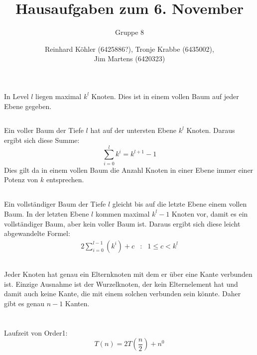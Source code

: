 \documentclass[10pt,a4paper,oneside,ngerman,numbers=noenddot]{scrartcl}
\begin{document}
\author{Reinhard Köhler (6425886?), Tronje Krabbe (6435002), \\
Jim Martens (6420323)}
\title{Hausaufgaben zum 6. November}
\subtitle{Gruppe 8}
\maketitle
\section{} %
	\subsection{} %
		In Level $l$ liegen maximal $k^{l}$ Knoten. Dies ist in einem vollen Baum auf jeder Ebene gegeben.
	\subsection{} %
		Ein voller Baum der Tiefe $l$ hat auf der untersten Ebene $k^{l}$ Knoten. Daraus ergibt sich diese Summe:
		\[
			\sum\limits_{i=0}^{l} k^{i} = k^{l+1} - 1
		\]
		Dies gilt da in einem vollen Baum die Anzahl Knoten in einer Ebene immer einer Potenz von $k$ entsprechen.
	\subsection{} %
		Ein vollständiger Baum der Tiefe $l$ gleicht bis auf die letzte Ebene einem vollen Baum. In der letzten Ebene $l$ kommen maximal $k^{l} - 1$ Knoten vor, damit es ein vollständiger Baum, aber kein voller Baum ist. Daraus ergibt sich diese leicht abgewandelte Formel:
		\begin{alignat*}{2}
			\sum\limits_{i=0}^{l-1} \left(k^{i}\right) + c &:& 1 \leq c < k^{l}
		\end{alignat*}
	\subsection{} %
		Jeder Knoten hat genau ein Elternknoten mit dem er über eine Kante verbunden ist. Einzige Ausnahme ist der Wurzelknoten, der kein Elternelement hat und damit auch keine Kante, die mit einem solchen verbunden sein könnte. Daher gibt es genau $n-1$ Kanten.
\section{} %
	\subsection{} %
		Laufzeit von Order1:
		\[
			T(n) = 2T\left(\frac{n}{2}\right) + n^{0}
		\]
		
\end{document}
